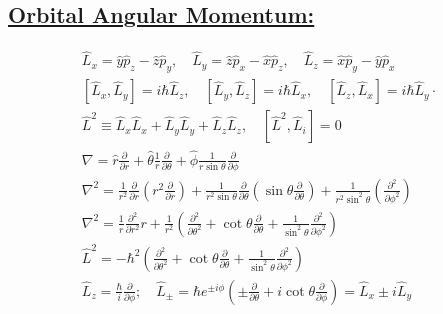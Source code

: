\documentclass[a4paper,12pt]{article}
\begin{document}
\subsection*{\underline{Orbital Angular Momentum:}}
\begin{gather}
    \hat{L}_{x}=\hat{y} \hat{p}_{z}-\hat{z} \hat{p}_{y}, \quad \hat{L}_{y}=\hat{z} \hat{p}_{x}-\hat{x} \hat{p}_{z}, \quad \hat{L}_{z}=\hat{x} \hat{p}_{y}-\hat{y} \hat{p}_{x} \\
    {\left[\hat{L}_{x}, \hat{L}_{y}\right]=i \hbar \hat{L}_{z}, \quad\left[\hat{L}_{y}, \hat{L}_{z}\right]=i \hbar \hat{L}_{x}, \quad\left[\hat{L}_{z}, \hat{L}_{x}\right]=i \hbar \hat{L}_{y} \cdot} \\
    \hat{L}^{2} \equiv \hat{L}_{x} \hat{L}_{x}+\hat{L}_{y} \hat{L}_{y}+\hat{L}_{z} \hat{L}_{z}, \quad\left[\hat{L}^{2}, \hat{L}_{i}\right]=0 \\
    \nabla=\hat{r}\frac{\partial}{\partial r}+\hat{\theta}\frac{1}{r}\frac{\partial}{\partial \theta}+\hat{\phi}\frac{1}{r\sin\theta}\frac{\partial}{\partial \phi}\\
    \nabla^{2}=\frac{1}{r^2} \frac{\partial}{\partial r}\left( r^2\frac{\partial}{\partial r} \right)
    +\frac{1}{r^{2}\sin\theta}\frac{\partial}{\partial \theta}\left( \sin\theta\frac{\partial}{\partial\theta} \right)
    +\frac{1}{r^{2}\sin^2\theta} \left( \frac{\partial^{2}}{\partial \phi^{2}} \right)\\
    \nabla^{2}=\frac{1}{r} \frac{\partial^{2}}{\partial r^{2}} r+\frac{1}{r^{2}}\left(\frac{\partial^{2}}{\partial \theta^{2}}+\cot \theta \frac{\partial}{\partial \theta}+\frac{1}{\sin ^{2} \theta} \frac{\partial^{2}}{\partial \phi^{2}}\right) \\
    \hat{L}^{2}=-\hbar^{2}\left(\frac{\partial^{2}}{\partial \theta^{2}}+\cot \theta \frac{\partial}{\partial \theta}+\frac{1}{\sin ^{2} \theta} \frac{\partial^{2}}{\partial \phi^{2}}\right) \\
    \hat{L}_{z}=\frac{\hbar}{i} \frac{\partial}{\partial \phi} ; \quad \hat{L}_{\pm}=\hbar e^{\pm i \phi}\left(\pm \frac{\partial}{\partial \theta}+i \cot \theta \frac{\partial}{\partial \phi}\right)=\hat{L}_{x}\pm i\hat{L}_{y}
\end{gather}
\end{document}
